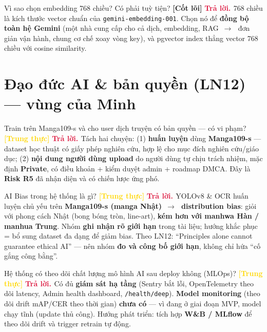 \documentclass[11pt]{article}
\newcommand{\arr}{\,\ensuremath{\rightarrow}\,}
\newcommand{\code}[1]{\texttt{\small #1}}
\newcommand{\tagCore}{\textcolor{steel}{\footnotesize\textbf{[Cốt lõi]}}}
\newcommand{\tagHonest}{\textcolor{gold}{\footnotesize\textbf{[Trung thực]}}}
\newcommand{\A}{\textbf{\textcolor{crimson}{Trả lời. }}}
\begin{document}
\begin{qa}{Vì sao chọn embedding 768 chiều? Có phải tuỳ tiện? \tagCore}
\A 768 chiều là kích thước vector chuẩn của \code{gemini-embedding-001}. Chọn nó để \textbf{đồng bộ toàn hệ Gemini} (một nhà cung cấp cho cả dịch, embedding, RAG \arr\ đơn giản vận hành, chung cơ chế xoay vòng key), và pgvector index thẳng vector 768 chiều với cosine similarity.
\end{qa}

\section{Đạo đức AI \& bản quyền (LN12) --- vùng của Minh}

\begin{qa}{Train trên Manga109-s và cho user dịch truyện có bản quyền --- có vi phạm? \tagHonest}
\A Tách hai chuyện: (1) \textbf{huấn luyện} dùng \textbf{Manga109-s} --- dataset học thuật có giấy phép nghiên cứu, hợp lệ cho mục đích nghiên cứu/giáo dục; (2) \textbf{nội dung người dùng upload} do người dùng tự chịu trách nhiệm, mặc định \textbf{Private}, có điều khoản + kiểm duyệt admin + roadmap DMCA. Đây là \textbf{Risk R5} đã nhận diện và có chiến lược ứng phó.
\end{qa}

\begin{qa}{AI Bias trong hệ thống là gì? \tagHonest}
\A YOLOv8 \& OCR huấn luyện chủ yếu trên \textbf{Manga109-s (manga Nhật)} \arr\ \textbf{distribution bias}: giỏi với phong cách Nhật (bong bóng tròn, line-art), \textbf{kém hơn với manhwa Hàn / manhua Trung}. Nhóm \textbf{ghi nhận rõ giới hạn} trong tài liệu; hướng khắc phục = bổ sung dataset đa dạng để giảm bias. Theo LN12: ``Principles alone cannot guarantee ethical AI'' --- nên nhóm \textbf{đo và công bố giới hạn}, không chỉ hứa ``cố gắng công bằng''.
\end{qa}

\begin{qa}{Hệ thống có theo dõi chất lượng mô hình AI sau deploy không (MLOps)? \tagHonest}
\A Có đủ \textbf{giám sát hạ tầng} (Sentry bắt lỗi, OpenTelemetry theo dõi latency, Admin health dashboard, \code{/health/deep}). \textbf{Model monitoring} (theo dõi drift mAP/CER theo thời gian) \textbf{chưa có} --- vì đang ở giai đoạn MVP, model chạy tĩnh (update thủ công). Hướng phát triển: tích hợp \textbf{W\&B / MLflow} để theo dõi drift và trigger retrain tự động.
\end{qa}
\end{document}

